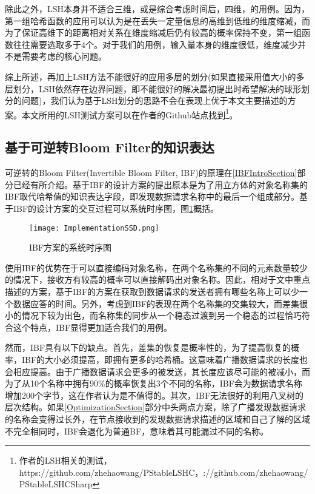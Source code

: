 \par
除此之外，LSH本身并不适合三维，或是综合考虑时间后，四维，的用例。因为，第一组哈希函数的应用可以认为是在丢失一定量信息的高维到低维的维度缩减，而为了保证高维下的距离相对关系在维度缩减后仍有较高的概率保持不变，第一组函数往往需要选取多于4个。对于我们的用例，输入量本身的维度很低，维度减少并不是需要考虑的核心问题。
\par
综上所述，再加上LSH方法不能很好的应用多层的划分(如果直接采用值大小的多层划分，LSH依然存在边界问题，即不能很好的解决最初提出时希望解决的球形划分的问题)，我们认为基于LSH划分的思路不会在表现上优于本文主要描述的方案。本文所用的LSH测试方案可以在作者的Github站点找到\footnote{作者的LSH相关的测试，https://github.com/zhehaowang/PStableLSHC，://github.com/zhehaowang/PStableLSHCSharp}。
\subsection{基于可逆转Bloom Filter的知识表达}
\label{IBFComparisonSection}
\par
可逆转的Bloom Filter(Invertible Bloom Filter, IBF)的原理在\ref{IBFIntroSection}部分已经有所介绍。基于IBF的设计方案的提出原本是为了用立方体的对象名称集的IBF取代哈希值的知识表达字段，即发现数据请求名称中的最后一个组成部分。基于IBF的设计方案的交互过程可以系统时序图，图\ref{fig:IBFSSD}概括。
\begin{figure}[!h]
	\centering
	\texttt{[image: ImplementationSSD.png]}
	\caption{IBF方案的系统时序图}
	\label{fig:IBFSSD}
\end{figure}
\par
使用IBF的优势在于可以直接编码对象名称，在两个名称集的不同的元素数量较少的情况下，接收方有较高的概率可以直接解码出对象名称。因此，相对于文中重点描述的方案，基于IBF的方案在获取到数据请求的发送者拥有哪些名称上可以少一个数据应答的时间。另外，考虑到IBF的表现在两个名称集的交集较大，而差集很小的情况下较为出色，而名称集的同步从一个稳态过渡到另一个稳态的过程恰巧符合这个特点，IBF显得更加适合我们的用例。
\par
然而，IBF具有以下的缺点。首先，差集的恢复是概率性的，为了提高恢复的概率，IBF的大小必须提高，即拥有更多的哈希桶。这意味着广播数据请求的长度也会相应提高。由于广播数据请求会更多的被发送，其长度应该尽可能的被减小，而为了从10个名称中拥有90\%的概率恢复出3个不同的名称，IBF会为数据请求名称增加200个字节，这在作者认为是不值得的。其次，IBF无法很好的利用八叉树的层次结构。如果\ref{OptimizationSection}部分中头两点方案，除了广播发现数据请求的名称会变得过长外，在节点接收到的发现数据请求描述的区域和自己了解的区域不完全相同时，IBF会退化为普通BF，意味着其可能漏过不同的名称。
